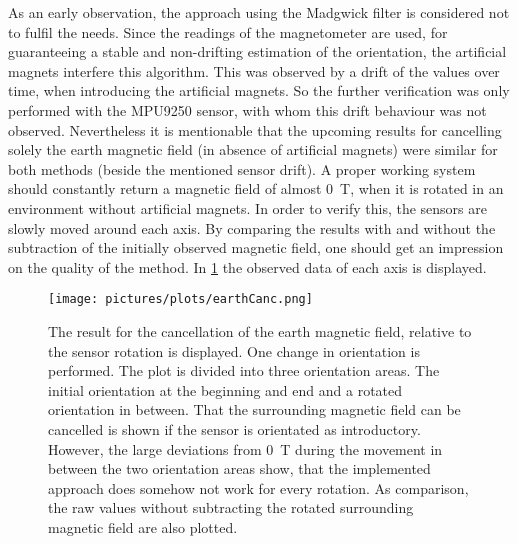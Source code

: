As an early observation, the approach using the Madgwick filter is considered not to fulfil the needs. Since the readings of the magnetometer are used, for guaranteeing a stable and non-drifting estimation of the orientation, the artificial magnets interfere this algorithm. This was observed by a drift of the values over time, when introducing the artificial magnets. So the further verification was only performed with the MPU9250 sensor, with whom this drift behaviour was not observed. Nevertheless it is mentionable that the upcoming results for cancelling solely the earth magnetic field (in absence of artificial magnets) were similar for both methods (beside the mentioned sensor drift). A proper working system should constantly return a magnetic field of almost \SI{0}{\tesla}, when it is rotated in an environment without artificial magnets. In order to verify this, the sensors are slowly moved around each axis. By comparing the results with and without the subtraction of the initially observed magnetic field, one should get an impression on the quality of the method. In \ref{fig:earthCancelRes} the observed data of each axis is displayed.\\
\begin{figure}[!htb]
\centering
\texttt{[image: pictures/plots/earthCanc.png]} 
\caption[Quality of earth cancellation]
{The result for the cancellation of the earth magnetic field, relative to the sensor rotation is displayed. One change in orientation is performed. The plot is divided into three orientation areas. The initial orientation at the beginning and end and a rotated orientation in between. That the surrounding magnetic field can be cancelled is shown if the sensor is orientated as introductory. However, the large deviations from \SI{0}{\tesla} during the movement in between the two orientation areas show, that the implemented approach does somehow not work for every rotation. As comparison, the raw values without subtracting the rotated surrounding magnetic field are also plotted.}
\label{fig:earthCancelRes}
\end{figure}
